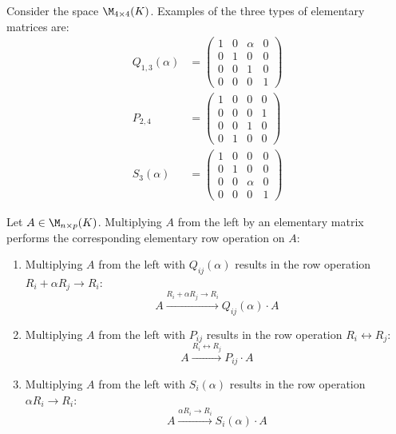 \begin{example}
Consider the space $\M_{4 \times 4}(K)$. Examples of the three types of elementary matrices are:
\begin{align*}
    Q_{1,3}(\alpha) &= \begin{pmatrix} 1 & 0 & \alpha & 0 \\ 0 & 1 & 0 & 0 \\ 0 & 0 & 1 & 0 \\ 0 & 0 & 0 & 1 \end{pmatrix} \\
    P_{2,4} &= \begin{pmatrix} 1 & 0 & 0 & 0 \\ 0 & 0 & 0 & 1 \\ 0 & 0 & 1 & 0 \\ 0 & 1 & 0 & 0 \end{pmatrix} \\
    S_3(\alpha) &= \begin{pmatrix} 1 & 0 & 0 & 0 \\ 0 & 1 & 0 & 0 \\ 0 & 0 & \alpha & 0 \\ 0 & 0 & 0 & 1 \end{pmatrix}
\end{align*}
\end{example}

\begin{lemma}
\label{lemma:row_operations_matrix_multiplication}
Let $A \in \M_{n \times p}(K)$. Multiplying $A$ from the left by an elementary matrix performs the corresponding elementary row operation on $A$:
\begin{enumerate}
    \item Multiplying $A$ from the left with $Q_{ij}(\alpha)$ results in the row operation $R_i + \alpha R_j \longrightarrow R_i$:
    \begin{equation*}
        A \xrightarrow{R_i + \alpha R_j \longrightarrow R_i} Q_{ij}(\alpha) \cdot A
    \end{equation*}
    \item Multiplying $A$ from the left with $P_{ij}$ results in the row operation $R_i \leftrightarrow R_j$:
    \begin{equation*}
        A \xrightarrow{R_i \leftrightarrow R_j} P_{ij} \cdot A
    \end{equation*}
    \item Multiplying $A$ from the left with $S_i(\alpha)$ results in the row operation $\alpha R_i \longrightarrow R_i$:
    \begin{equation*}
        A \xrightarrow{\alpha R_i \longrightarrow R_i} S_i(\alpha) \cdot A
    \end{equation*}
\end{enumerate}
\end{lemma}

